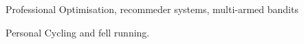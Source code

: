 
\begin{cvskills}
  \cvskill
    {Professional} %
    {Optimisation, recommeder systems, multi-armed bandits} %

  \cvskill
    {Personal} %
    {Cycling and fell running.} %
\end{cvskills}